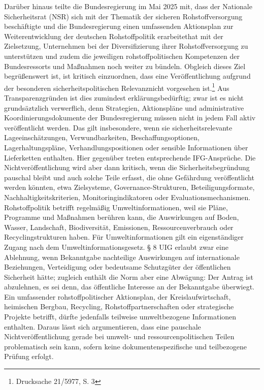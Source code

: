 \documentclass[12pt,a4paper,oneside]{book} %
\begin{document}
Darüber hinaus teilte die Bundesregierung im Mai 2025 mit, dass der Nationale Sicherheitsrat (NSR) sich mit der Thematik der sicheren Rohstoffversorgung beschäftigte und die Bundesregierung einen \glqq umfassenden Aktionsplan zur Weiterentwicklung der deutschen Rohstoffpolitik erarbeitet\grqq hat mit der Zielsetzung, Unternehmen  bei der Diversifizierung ihrer Rohstoffversorgung zu unterstützen und zudem \glqq die jeweiligen rohstoffpolitischen Kompetenzen der Bundesressorts und Maßnahmen noch weiter zu bündeln\grqq. Obgleich dieses Ziel begrüßenswert ist, ist kritisch einzuordnen, dass eine Veröffentlichung aufgrund der \glqq besonderen sicherheitspolitischen Relevanz\grqq nicht vorgesehen ist.\footnote{Drucksache 21/5977, S. 3} Aus Transparenzgründen ist dies zumindest erklärungsbedürftig; zwar ist es nicht grundsäztzlich verwerflich, denn Strategien, Aktionspläne und administrative Koordinierungsdokumente der Bundesregierung müssen nicht in jedem Fall aktiv veröffentlicht werden. Das gilt insbesondere, wenn sie sicherheitsrelevante Lageeinschätzungen, Verwundbarkeiten, Beschaffungsoptionen, Lagerhaltungspläne, Verhandlungspositionen oder sensible Informationen über Lieferketten enthalten. Hier gegenüber treten entsprechende IFG-Ansprüche. Die Nichtveröffentlichung wird aber dann kritisch, wenn die Sicherheitsbegründung pauschal bleibt und auch solche Teile erfasst, die ohne Gefährdung veröffentlicht werden könnten, etwa Zielsysteme, Governance-Strukturen, Beteiligungsformate, Nachhaltigkeitskriterien, Monitoringindikatoren oder Evaluationsmechanismen. Rohstoffpolitik betrifft regelmäßig Umweltinformationen, weil sie Pläne, Programme und Maßnahmen berühren kann, die Auswirkungen auf Boden, Wasser, Landschaft, Biodiversität, Emissionen, Ressourcenverbrauch oder Recyclingstrukturen haben. Für Umweltinformationen gilt ein eigenständiger Zugang nach dem Umweltinformationsgesetz. § 8 UIG erlaubt zwar eine Ablehnung, wenn Bekanntgabe nachteilige Auswirkungen auf internationale Beziehungen, Verteidigung oder bedeutsame Schutzgüter der öffentlichen Sicherheit hätte; zugleich enthält die Norm aber eine Abwägung: Der Antrag ist abzulehnen, es sei denn, das öffentliche Interesse an der Bekanntgabe überwiegt. Ein umfassender rohstoffpolitischer Aktionsplan, der Kreislaufwirtschaft, heimischen Bergbau, Recycling, Rohstoffpartnerschaften oder strategische Projekte betrifft, dürfte jedenfalls teilweise umweltbezogene Informationen enthalten. Daraus lässt sich argumentieren, dass eine pauschale Nichtveröffentlichung gerade bei umwelt- und ressourcenpolitischen Teilen problematisch sein kann, sofern keine dokumentenspezifische und teilbezogene Prüfung erfolgt.
\end{document}
